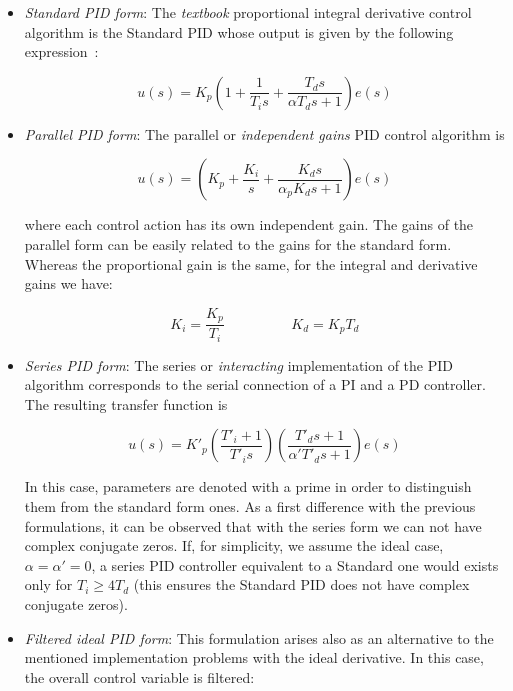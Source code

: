 \begin{itemize}
\item \emph{Standard PID form}: The \emph{textbook} proportional integral derivative control algorithm is the Standard PID whose output is given by the following expression~\citep{astromhagglund1995}:

\begin{equation}
    u(s)= K_p \left( 1 + \frac{1}{T_i s} + \frac{T_d s}{\alpha T_d s+1} \right ) e(s)
    \label{eq:PIDstandard}
\end{equation}

\item \emph{Parallel PID form}: The parallel or \emph{independent gains} PID control algorithm is

\begin{equation}
	u(s) =  \left( K_p + \frac{K_i}{s}+ \frac{K_d s}{\alpha_p K_d s+1}\right) e(s)
\end{equation}

\noindent where each control action has its own independent gain. The gains of the parallel form can be easily related to the gains for the standard form. Whereas the proportional gain is the same, for the integral and derivative gains we have:

\begin{equation}
K_i=\frac{K_p}{T_i} \hspace{2cm}  K_d=K_pT_d 
\end{equation} 

\item \emph{Series PID form}: The  series or \emph{interacting} implementation of the PID algorithm corresponds to the serial connection of a PI and a PD controller. The resulting transfer function is

\begin{equation}
	u(s) = K'_p \left( \frac{T'_i+1}{T'_i s}\right) \left(\frac{T'_d s + 1}{\alpha' T'_d s +1}\right)e(s)
\end{equation}

In this case, parameters are denoted with a prime in order to distinguish them from the standard form ones. As a first difference with the previous formulations, it can be observed that with the series form we can not have complex conjugate zeros. If, for simplicity, we assume the ideal case, $\alpha=\alpha'=0$, a series PID controller equivalent to a Standard one would exists only for $T_i \ge 4 T_d$ (this ensures the Standard PID does not have complex conjugate zeros).

\item \emph{Filtered ideal PID form}: This formulation arises also as an alternative to the mentioned implementation problems with the ideal derivative. In this case, the overall control variable is filtered:


\end{itemize}
